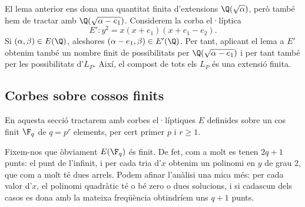 El lema anterior ens dona una quantitat finita d'extensions $\Q(\sqrt{\alpha})$, però també hem de tractar amb $\Q(\sqrt{\alpha-e_1})$. Considerem la corba el·líptica
\[
E'\colon y^2=x(x+e_1)(x+e_1-e_2).
\]
Si $(\alpha,\beta)\in E(\Q)$, aleshores $(\alpha -e_1,\beta)\in E'(\Q)$. Per tant, aplicant el lema a $E'$ obtenim també un nombre finit de possibilitats per $\Q(\sqrt{\alpha-e_1})$ i per tant també per les possibilitats d'$L_P$. Així, el compost de tots els $L_P$ és una extensió finita.

 \subsection{Corbes sobre cossos finits}
 
 En aquesta secció tractarem amb corbes el·líptiques $E$ definides sobre un cos finit $\F_q$ de $q=p^r$ elements, per cert primer $p$ i $r\geq 1$.

Fixem-nos que òbviament $E(\F_q)$ és finit. De fet, com a molt es tenen $2q+1$ punts: el punt de l'infinit, i per cada tria d'$x$ obtenim un polinomi en $y$ de grau $2$, que com a molt té dues arrels. Podem afinar l'anàlisi una mica més: per cada valor d'$x$, el polinomi quadràtic té o bé zero o dues solucions, i si cadascun dels casos es dona amb la mateixa freqüència obtindríem uns $q+1$ punts.

